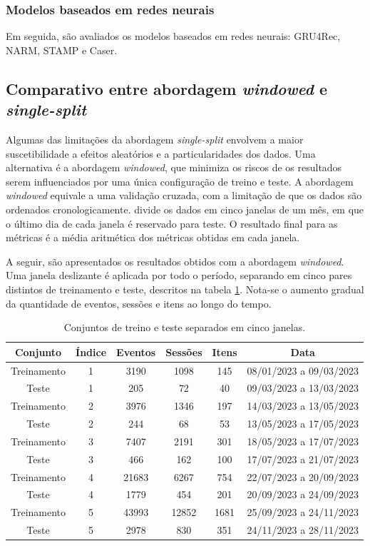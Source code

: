 \subsubsection{Modelos baseados em redes neurais}
Em seguida, são avaliados os modelos baseados em redes neurais: GRU4Rec, NARM,
STAMP e Caser.

\subsection{Comparativo entre abordagem \textit{windowed} e \textit{single-split}}

Algumas das limitações da abordagem \textit{single-split} envolvem a maior
suscetibilidade a efeitos aleatórios e a particularidades dos dados. Uma
alternativa é a abordagem \textit{windowed}, que minimiza os riscos de os
resultados serem influenciados por uma única configuração de treino e teste. A
abordagem \textit{windowed} equivale a uma validação cruzada, com a limitação de
que os dados são ordenados cronologicamente. \citet{ludewig_2018} divide os
dados em cinco janelas de um mês, em que o último dia de cada janela é reservado
para teste. O resultado final para as métricas é a média aritmética dos
métricas obtidas em cada janela.

A seguir, são apresentados os resultados obtidos com a abordagem
\textit{windowed}. Uma janela deslizante é aplicada por todo o período,
separando em cinco pares distintos de treinamento e teste, descritos na tabela
\ref{tab:windowed_data}. Nota-se o aumento gradual da quantidade de eventos,
sessões e itens ao longo do tempo.

\begin{table}[htbp]
  \centering
  \begin{tabular}{|c|c|c|c|c|c|}
    \hline
    Conjunto & Índice & Eventos & Sessões & Itens & Data\\
    \hline
    Treinamento & 1 & 3190 & 1098 & 145 & 08/01/2023 a 09/03/2023\\
    \hline
    Teste & 1 & 205 & 72 & 40 & 09/03/2023 a 13/03/2023\\
    \hline
    Treinamento & 2 & 3976 & 1346 & 197 & 14/03/2023 a 13/05/2023\\
    \hline
    Teste & 2 & 244 & 68 & 53 & 13/05/2023 a 17/05/2023\\
    \hline
    Treinamento & 3 & 7407 & 2191 & 301 & 18/05/2023 a 17/07/2023\\
    \hline
    Teste & 3 & 466 & 162 & 100 & 17/07/2023 a 21/07/2023\\
    \hline
    Treinamento & 4 & 21683 & 6267 & 754 & 22/07/2023 a 20/09/2023\\
    \hline
    Teste & 4 & 1779 & 454 & 201 & 20/09/2023 a 24/09/2023\\
    \hline
    Treinamento & 5 & 43993 & 12852 & 1681 & 25/09/2023 a 24/11/2023\\
    \hline
    Teste & 5 & 2978 & 830 & 351 & 24/11/2023 a 28/11/2023\\
    \hline
  \end{tabular}
  \caption{Conjuntos de treino e teste separados em cinco janelas.}
  \label{tab:windowed_data}
\end{table}

